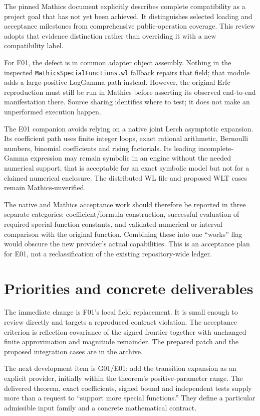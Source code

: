 \documentclass[11pt,a4paper]{article}
\newcommand{\code}[1]{\nolinkurl{#1}}
\begin{document}
The pinned Mathics document explicitly describes complete compatibility as a
project goal that has not yet been achieved. It distinguishes selected loading
and acceptance milestones from comprehensive public-operation coverage.
This review adopts that evidence distinction rather than overriding it with a
new compatibility label.\cite{mathicsguide}

For F01, the defect is in common adapter object assembly. Nothing in the
inspected \code{MathicsSpecialFunctions.wl} fallback repairs that field; that
module adds a large-positive LogGamma path instead. However, the original
Erfc reproduction must still be run in Mathics before asserting its observed
end-to-end manifestation there. Source sharing identifies where to test; it
does not make an unperformed execution happen.\cite{mathicsspecial}

The E01 companion avoids relying on a native joint Lerch asymptotic expansion.
Its coefficient path uses finite integer loops, exact rational arithmetic,
Bernoulli numbers, binomial coefficients and rising factorials. Its leading
incomplete-Gamma expression may remain symbolic in an engine without the
needed numerical support; that is acceptable for an exact symbolic model but
not for a claimed numerical enclosure. The distributed WL file and proposed
WLT cases remain Mathics-unverified.

The native and Mathics acceptance work should therefore be reported in three
separate categories: coefficient/formula construction, successful evaluation
of required special-function constants, and validated numerical or interval
comparison with the original function. Combining these into one ``works'' flag
would obscure the new provider's actual capabilities. This is an acceptance
plan for E01, not a reclassification of the existing repository-wide ledger.

\section{Priorities and concrete deliverables}

The immediate change is F01's local field replacement. It is small enough to
review directly and targets a reproduced contract violation. The acceptance
criterion is reflection covariance of the signed frontier together with
unchanged finite approximation and magnitude remainder. The prepared patch
and the proposed integration cases are in the archive.

The next development item is G01/E01: add the transition expansion as an
explicit provider, initially within the theorem's positive-parameter range.
The delivered theorem, exact coefficients, signed bound and independent tests
supply more than a request to ``support more special functions.'' They define
a particular admissible input family and a concrete mathematical contract.
\end{document}
